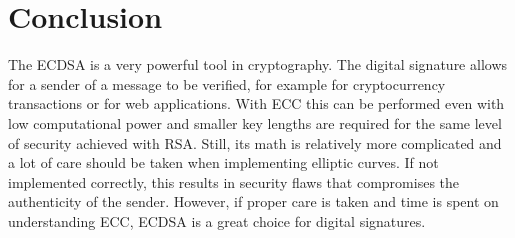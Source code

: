 \section{Conclusion}
The ECDSA is a very powerful tool in cryptography. The digital signature allows for a sender of a message to be verified, for example for cryptocurrency transactions or for web applications. With ECC this can be performed even with low computational power and smaller key lengths are required for the same level of security achieved with RSA. Still, its math is relatively more complicated and a lot of care should be taken when implementing elliptic curves. If not implemented correctly, this results in security flaws that compromises the authenticity of the sender. However, if proper care is taken and time is spent on understanding ECC, ECDSA is a great choice for digital signatures.